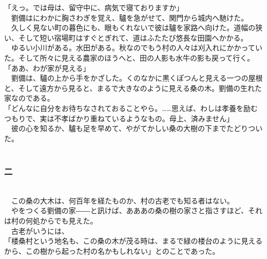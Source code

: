 \documentclass[
  paper=a5,
  fontsize=10pt,
  jafontsize=9.5pt,
  tate,                  %
  open_bracket_pos=nibu, %
]{jlreq}
\begin{document}
「えっ。では母は、留守中に、病気で寝ておりますか」\\


　劉備はにわかに胸さわぎを覚え、驢を急がせて、関門から城内へ馳けた。\\


　久しく見ない町の暮色にも、眼もくれないで彼は驢を家路へ向けた。道幅の狭い、そして短い宿場町はすぐとぎれて、道はふたたび悠長な田園へかかる。\\


　ゆるい小川がある。水田がある。秋なのでもう村の人々は刈入れにかかっていた。そして所々に見える農家のほうへと、田の人影も水牛の影も戻って行く。\\


「ああ、わが家が見える」\\


　劉備は、驢の上から手をかざした。くのなかに黒くぽつんと見える一つの屋根と、そして遠方から見ると、まるで大きなのように見える桑の木。劉備の生れた家なのである。\\


「どんなに自分をお待ちなされておることやら。……思えば、わしは孝養を励むつもりで、実は不孝ばかり重ねているようなもの。母上、済みません」\\


　彼の心を知るか、驢も足を早めて、やがてかしい桑の大樹の下までたどりついた。\\

\\

\subsubsection{二}

\\


　この桑の大木は、何百年を経たものか、村の古老でも知る者はない。\\


　やをつくる劉備の家――と訊けば、あああの桑の樹の家さと指さすほど、それは村の何処からでも見えた。\\


　古老がいうには、\\


「楼桑村という地名も、この桑の木が茂る時は、まるで緑の楼台のように見えるから、この樹から起った村の名かもしれない」とのことであった。\\
\end{document}
